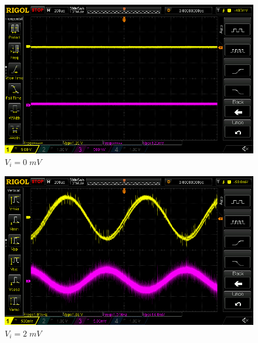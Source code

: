 \documentclass[uplatex,a4paper,11pt,oneside,openany]{jsbook}
\begin{document}
\begin{spacing}{0.71}
\begin{multicols}{2}
  \begin{figure}[H]
     \centering
      \includegraphics[keepaspectratio, scale=0.28, angle=0]
                  {rigol/figs/IOCharM1Y1_2kR/0mV.png}
                  \caption{$V_i=0\;mV$}
                  \label{fig:ioc0}
  \end{figure}

  \begin{figure}[H]
     \centering
      \includegraphics[keepaspectratio, scale=0.28, angle=0]
                {rigol/figs/IOCharM1Y1_2kR/2mV.png}
                \caption{$V_i=2\;mV$}
                \label{fig:ioc2}
  \end{figure}
\end{multicols}


\end{spacing}
\end{document}
